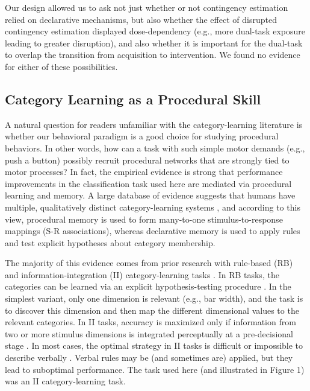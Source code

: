 \documentclass[man,apacite,draftfirst]{apa6}
\begin{document}
Our design allowed us to ask not just whether or not contingency estimation
relied on declarative mechanisms, but also whether the effect of disrupted
contingency estimation displayed dose-dependency (e.g., more dual-task exposure
leading to greater disruption), and also whether it is important for the dual-task
to overlap the transition from acquisition to intervention. We found no evidence
for either of these possibilities.

\subsection*{Category Learning as a Procedural Skill}
A natural question for readers unfamiliar with the category-learning literature
is whether our behavioral paradigm is a good choice for studying procedural
behaviors. In other words, how can a task with such simple motor demands (e.g.,
push a button) possibly recruit procedural networks that are strongly tied to
motor processes? In fact, the empirical evidence is strong that performance
improvements in the classification task used here are mediated via procedural
learning and memory. A large database of evidence suggests that humans have
multiple, qualitatively distinct category-learning systems \cite{AshbyCOVIS1998,
AshbyMaddox2005, EricksonKruschke1998}, and according to this view, procedural
memory is used to form many-to-one stimulus-to-response mappings (S-R
associations), whereas declarative memory is used to apply rules and test
explicit hypotheses about category membership.

The majority of this evidence comes from prior research with rule-based (RB) and
information-integration (II) category-learning tasks \cite{HelieRoederAshby2010,
NomuraEtAl2007, SotoEtAl2013, WaldschmidtAshby2011}. In RB tasks, the categories
can be learned via an explicit hypothesis-testing procedure
\cite{AshbyCOVIS1998}. In the simplest variant, only one dimension is relevant
(e.g., bar width), and the task is to discover this dimension and then map the
different dimensional values to the relevant categories. In II tasks, accuracy
is maximized only if information from two or more stimulus dimensions is
integrated perceptually at a pre-decisional stage \cite{AshbyGott1988}. In most
cases, the optimal strategy in II tasks is difficult or impossible to describe
verbally \cite{AshbyCOVIS1998}. Verbal rules may be (and sometimes are) applied,
but they lead to suboptimal performance. The task used here (and illustrated in
Figure 1) was an II category-learning task.
\end{document}
